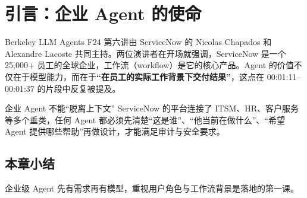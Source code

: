 \section{引言：企业 Agent 的使命}
Berkeley LLM Agents F24 第六讲由 ServiceNow 的 Nicolas Chapados 和 Alexandre Lacoste 共同主持。两位演讲者在开场就强调，ServiceNow 是一个 25,000+ 员工的全球企业，工作流（workflow）是它的核心产品。Agent 的价值不仅在于模型能力，而在于\textbf{“在员工的实际工作背景下交付结果”}，这点在 00:01:11--00:01:37 的片段中反复被提及。

\begin{knowledgebox}{企业 Agent 不能“脱离上下文”}
ServiceNow 的平台连接了 ITSM、HR、客户服务等多个垂类，任何 Agent 都必须先清楚“这是谁”、“他当前在做什么”、“希望 Agent 提供哪些帮助”再做设计，才能满足审计与安全要求。
\end{knowledgebox}

\subsection{本章小结}
企业级 Agent 先有需求再有模型，重视用户角色与工作流背景是落地的第一课。


